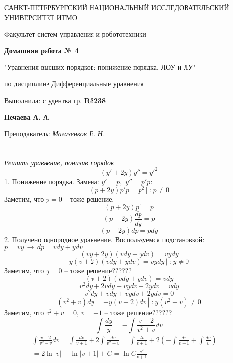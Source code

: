 \documentclass[a5paper, 10pt]{article}
\theoremstyle{definition}
\theoremstyle{plain}
\theoremstyle{remark}
\newcommand*{\titlePage}{
	\thispagestyle{title}
	\begingroup
	\begin{center}
		\vspace*{6ex}
		
		{\small
			САНКТ-ПЕТЕРБУРГСКИЙ НАЦИОНАЛЬНЫЙ ИССЛЕДОВАТЕЛЬСКИЙ УНИВЕРСИТЕТ ИТМО	
		}
		
		\vspace*{2ex}
		
		{\normalsize
			Факультет систем управления и робототехники
		}
		
		\vspace*{15ex}
		
		{\Large \bfseries 
			Домашняя работа № 4
		}
\vspace*{2ex}
	{\Large \bfseries 
			
"Уравнения высших порядков: понижение порядка, ЛОУ и ЛУ"
		}
\vspace*{2ex}
		
		{\normalsize
			по дисциплине Дифференциальные уравнения
		}

	\end{center}
	\vspace*{20ex}
	\begin{flushright}
		{\large 
			\underline{Выполнила}: студентка гр. \textbf{R3238}\\
			\begin{flushright}
				\textbf{Нечаева А. А.}\\
			\end{flushright}
		}
		
		\vspace*{5ex}
		
		{\large 
			\underline{Преподаватель}: \textit{Магазенков Е. Н.}
		}
	\end{flushright}	
	\newpage
	\setcounter{page}{1}
	\endgroup}
\begin{document}
	\titlePage
	\pagestyle{style}
\newpage
\section{}
\textit{Решить уравнение, понизив порядок}
\\
\begin{equation}
\left( y' + 2y \right) y'' = y'^2
\end{equation}
1. Понижение порядка. Замена: $y'=p, \, \, y''=p'p$:
\begin{equation}
\left( p + 2y \right) p'p = p^2 \, \left|\, \, : p \neq 0 \right.
\end{equation}
Заметим, что $p=0$ -- тоже решение.
\begin{equation}
\left( p + 2y \right) p' = p
\end{equation}
\begin{equation}
\left( p + 2y \right) \frac{dp}{dy} = p
\end{equation}
\begin{equation}
\left( p + 2y \right) dp = pdy
\end{equation}
2. Получено однородное уравнение. Воспользуемся подстановкой: $p = vy \, \to \, dp=vdy+ydv$
\begin{equation}
\left( vy + 2y \right) \left(  vdy+ydv \right) =  vydy
\end{equation}
\begin{equation}
y\left( v + 2 \right) \left(  vdy+ydv \right) =  vydy  \, \left|\, \, : y \neq 0 \right.
\end{equation}
Заметим, что $y=0$ -- тоже решение??????
\begin{equation}
\left( v + 2 \right) \left(  vdy+ydv \right) =  vdy 
\end{equation}
\begin{equation}
v^2dy+2vdy+vydv+2ydv=vdy
\end{equation}
\begin{equation}
v^2dy+vdy+vydv+2ydv=0
\end{equation}
\begin{equation}
(v^2+v)dy=-y(v+2)dv  \, \left|\, \, : y (v^2+v) \neq 0 \right.
\end{equation}
Заметим, что $v^2+v = 0, \, v = -1$ -- тоже решение??????
\begin{equation}
\int \frac{dy}{y} = -\int \frac{v+2}{v^2+v}dv
\end{equation}
\begin{multline}
\int \frac{v+2}{v^2+v}dv = \int \frac{dv}{v+1} + 2\int \frac{dv}{v^2+v} = \int \frac{dv}{v+1} + 2\left(-\int \frac{dv}{v+1}+ \int \frac{dv}{v} \right) = \\
= 2 \ln |v| - \ln |v+1| + C = \ln C \frac{v^2}{v+1}
\end{multline}
\end{document}
